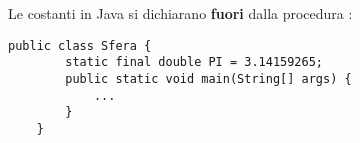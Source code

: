 \documentclass[../main.tex]{subfiles}
\begin{document}
Le costanti in Java si dichiarano \textbf{fuori} dalla procedura :
\begin{lstlisting}[style=java]
    public class Sfera {
        static final double PI = 3.14159265;
        public static void main(String[] args) {
            ...
        }
    }
\end{lstlisting}
\end{document}
